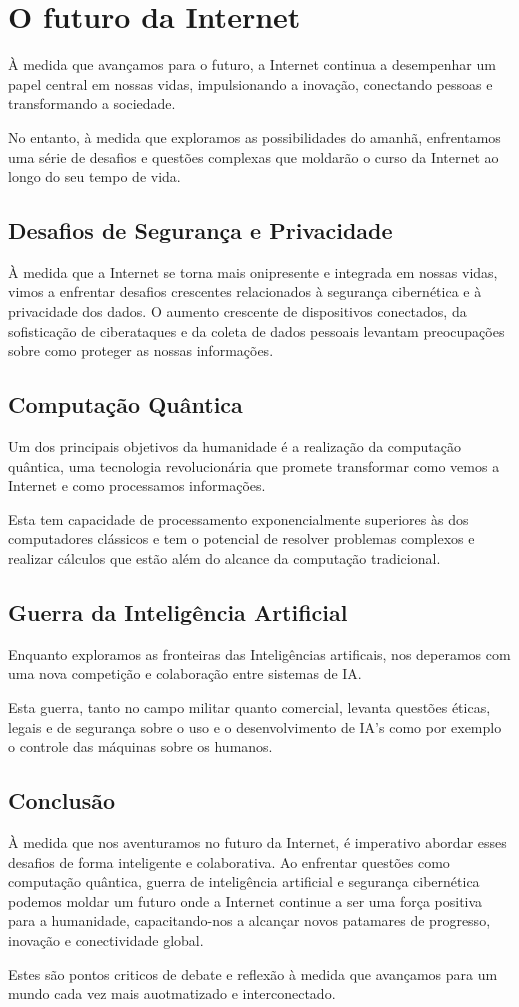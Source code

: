 \section{O futuro da Internet}
À medida que avançamos para o futuro, a Internet continua a desempenhar um papel 
central em nossas vidas, impulsionando a inovação, conectando pessoas e transformando 
a sociedade. 

No entanto, à medida que exploramos as possibilidades do amanhã, enfrentamos uma série 
de desafios e questões complexas que moldarão o curso da Internet ao longo do seu tempo 
de vida.

\subsection{Desafios de Segurança e Privacidade}
À medida que a Internet se torna mais onipresente e integrada em nossas vidas,
vimos a enfrentar desafios crescentes relacionados à segurança cibernética e à 
privacidade dos dados. O aumento crescente de dispositivos conectados, 
da sofisticação de ciberataques e da coleta de dados pessoais levantam preocupações
sobre como proteger as nossas informações.

\subsection{Computação Quântica}
Um dos principais objetivos da humanidade é a realização da computação quântica,
uma tecnologia revolucionária que promete transformar como vemos a Internet e como 
processamos informações. 

Esta tem capacidade de processamento exponencialmente superiores às dos computadores clássicos
e tem o potencial de resolver problemas complexos e realizar cálculos que estão além do alcance 
da computação tradicional.

\subsection{Guerra da Inteligência Artificial}
Enquanto exploramos as fronteiras das Inteligências artificais, nos deperamos com 
uma nova competição e colaboração entre sistemas de IA.

Esta guerra, tanto no campo militar quanto comercial, levanta questões éticas, legais e de 
segurança sobre o uso e o desenvolvimento de IA's como por exemplo o controle das máquinas
sobre os humanos. 

\subsection{Conclusão}
À medida que nos aventuramos no futuro da Internet, é imperativo abordar esses desafios 
de forma inteligente e colaborativa. Ao enfrentar questões como computação quântica, 
guerra de inteligência artificial e segurança cibernética podemos moldar um futuro onde a 
Internet continue a ser uma força positiva para a humanidade, capacitando-nos a alcançar 
novos patamares de progresso, inovação e conectividade global. 

Estes são pontos criticos de debate e reflexão à medida que avançamos para um 
mundo cada vez mais auotmatizado e interconectado.